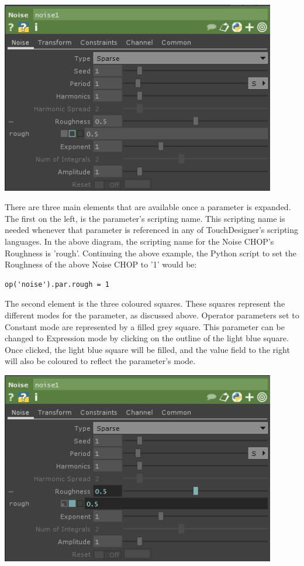 \begin{fullwidth}
\begin{center}
\includegraphics[width=12cm]{./img/2.2/parameters-2.PNG} 
\end{center}

There are three main elements that are available once a parameter is expanded. The first on the left, is the parameter's scripting name. This scripting name is needed whenever that parameter is referenced in any of TouchDesigner's scripting languages. In the above diagram, the scripting name for the Noise CHOP's Roughness is 'rough'. Continuing the above example, the Python script to set the Roughness of the above Noise CHOP to '1' would be:

\begin{lstlisting}
op('noise').par.rough = 1
\end{lstlisting}

The second element is the three coloured squares. These squares represent the different modes for the parameter, as discussed above. Operator parameters set to Constant mode are represented by a filled grey square. This parameter can be changed to Expression mode by clicking on the outline of the light blue square. Once clicked, the light blue square will be filled, and the value field to the right will also be coloured to reflect the parameter's mode.

\begin{center}
\includegraphics[width=12cm]{./img/2.2/parameters-3.PNG}
\end{center}


\end{fullwidth}
